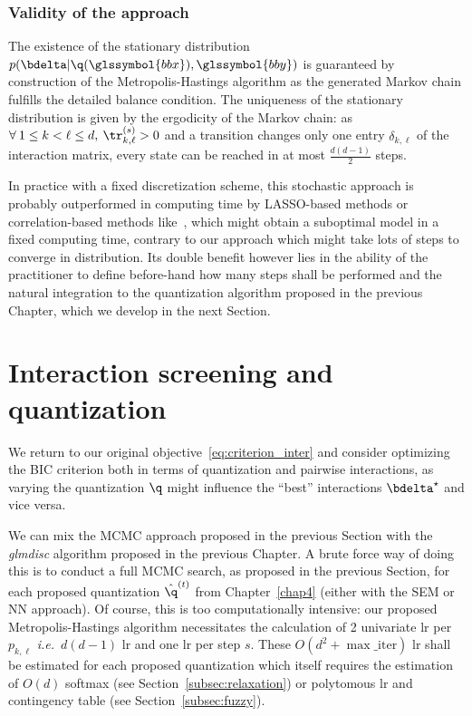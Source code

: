 \subsubsection{Validity of the approach}


The existence of the stationary distribution $p(\bdelta | \q(\glssymbol{bbx}),\glssymbol{bby})$ is guaranteed by construction of the Metropolis-Hastings algorithm as the generated Markov chain fulfills the detailed balance condition. The uniqueness of the stationary distribution is given by the ergodicity of the Markov chain: as $\forall \: 1 \leq  k < \ell \leq d, \: \tr_{k,\ell}^{(s)} > 0$ and a transition changes only one entry $\delta_{k,\ell}$ of the interaction matrix, every state can be reached in at most $\frac{d(d-1)}{2}$ steps.

In practice with a fixed discretization scheme, this stochastic approach is probably outperformed in computing time by LASSO-based methods or correlation-based methods like~\cite{simon}, which might obtain a suboptimal model in a fixed computing time, contrary to our approach which might take lots of steps to converge in distribution. Its double benefit however lies in the ability of the practitioner to define before-hand how many steps shall be performed and the natural integration to the quantization algorithm proposed in the previous Chapter, which we develop in the next Section.

\section{Interaction screening and quantization}

We return to our original objective~\ref{eq:criterion_inter} and consider optimizing the BIC criterion both in terms of quantization and pairwise interactions, as varying the quantization $\q$ might influence the ``best'' interactions $\bdelta^\star$ and vice versa.

We can mix the MCMC approach proposed in the previous Section with the \textit{glmdisc} algorithm proposed in the previous Chapter. A brute force way of doing this is to conduct a full MCMC search, as proposed in the previous Section, for each proposed quantization $\hat{\q}^{(t)}$ from Chapter~\ref{chap4} (either with the SEM or NN approach). Of course, this is too computationally intensive: our proposed Metropolis-Hastings algorithm necessitates the calculation of 2 univariate \gls{lr} per $p_{k,\ell}$ \textit{i.e.}\ $d(d-1)$ \gls{lr} and one \gls{lr} per step $s$. These $O(d^2 + \max\_{\text{iter}})$ \gls{lr} shall be estimated for each proposed quantization which itself requires the estimation of $O(d)$ softmax (see Section~\ref{subsec:relaxation}) or polytomous \gls{lr} and contingency table (see Section~\ref{subsec:fuzzy}).

